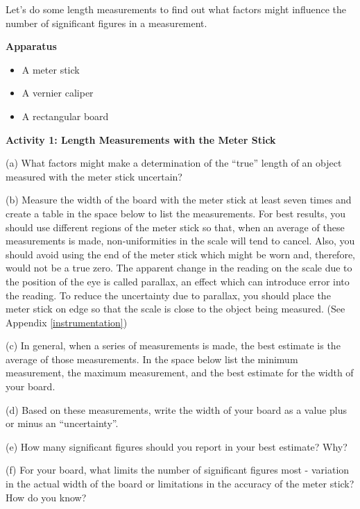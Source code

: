 Let's do some length measurements to find out what factors might influence the
number of significant figures in a measurement. 

\textbf{Apparatus} 

\begin{itemize}
\item A meter stick 
\item A vernier caliper 
\item A rectangular board
\end{itemize}
\textbf{Activity 1: Length Measurements with the Meter Stick }

(a) What factors might make a determination of the ``true''
length of an object measured with the meter stick uncertain? 
\vspace{20mm}

(b) Measure the width of the board with the meter stick at least seven times
and create a table in the space below to list the measurements. For best results,
you should use different regions of the meter stick so that, when an average
of these measurements is made, non-uniformities in the scale will tend to cancel.
Also, you should avoid using the end of the meter stick which might be worn
and, therefore, would not be a true zero. The apparent change in the reading
on the scale due to the position of the eye is called parallax, an effect which
can introduce error into the reading. To reduce the uncertainty due to parallax,
you should place the meter stick on edge so that the scale is close to the object
being measured. (See Appendix \ref{instrumentation}) 
\vspace{25mm}

(c) In general, when a series of measurements is made, the best estimate is
the average of those measurements. In the space below list the minimum measurement,
the maximum measurement, and the best estimate for the width of your board.
\vspace{20mm}

(d) Based on these measurements, write the width of your board as a value plus or minus an ``uncertainty''.
\vspace{15mm}

(e) How many significant figures should you report in your best estimate? Why?
\vspace{15mm}

(f) For your board, what limits the number of significant figures most - variation
in the actual width of the board or limitations in the accuracy of the meter
stick? How do you know?
\vspace{15mm}

